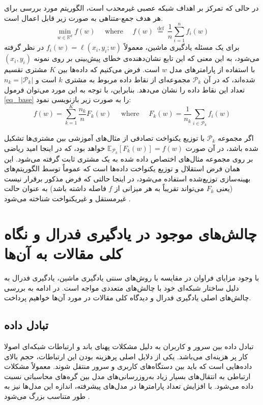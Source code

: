 در حالی که تمرکز بر اهداف شبکه عصبی غیرمحدب%
است، الگوریتم مورد بررسی برای هر هدف جمع-متناهی%
به صورت زیر قابل اعمال است.
\begin{equation}
	\min _{w \in \mathbb{R}^d} f(w) \quad \text { where } \quad f(w) \stackrel{\text { def }}{=} \frac{1}{n} \sum_{i=1}^n f_i(w)
	\label{eq_base}
\end{equation}
برای یک مسئله یادگیری ماشین، معمولاً
$f_i(w)=\ell\left(x_i, y_i ; w\right)$
در نظر گرفته می‌شود، به این معنی که این تابع نشان‌دهنده‌ی خطای پیش‌بینی بر روی نمونه
$(x_i, y_i)$
با استفاده از پارامترهای مدل
$w$
است. فرض می‌کنیم که داده‌ها بین
$K$
مشتری تقسیم شده‌اند، که در آن
$\mathcal{P}_k$
مجموعه‌ای از نقاط داده مربوط به مشتری
$k$
است و
$n_k=\left|\mathcal{P}_k\right|$
تعداد این نقاط داده را نشان می‌دهد. بنابراین، با توجه به این مورد می‌توان فرمول
\ref{eq_base}
را به صورت زیر بازنویسی نمود:
\begin{equation}
	f(w)=\sum_{k=1}^K \frac{n_k}{n} F_k(w) \quad \text { where } \quad F_k(w)=\frac{1}{n_k} \sum_{i \in \mathcal{P}_k} f_i(w)
\end{equation}

اگر مجموعه
$\mathcal{P}_k$
با توزیع یکنواخت%
تصادفی از مثال‌های آموزشی بین مشتری‌ها تشکیل شده باشد، در آن صورت
$\mathbb{E}_{\mathcal{P}_k}\left[F_k(w)\right]=f(w)$ 
خواهد بود، که در اینجا امید ریاضی بر روی مجموعه مثال‌های اختصاص داده شده به یک مشتری ثابت گرفته می‌شود. این همان فرض
استقلال و توزیع یکنواخت داده‌ها%
است که عموماً توسط الگوریتم‌های بهینه‌سازی توزیع‌شده استفاده می‌شود، در اینجا حالتی که فرض مذکور برقرار نیست (یعنی
$F_k$
می‌تواند تقریباً به هر میزانی از
$f$
فاصله داشته باشد) به عنوان حالت
غیرمستقل و غیریکنواخت
شناخته می‌شود
\cite{mcmahan2017communication}.



\section{چالش‌های موجود در یادگیری فدرال و نگاه کلی مقالات به آن‌ها}
با وجود مزایای فراوان در مقایسه با روش‌های سنتی یادگیری ماشین، یادگیری فدرال به دلیل ساختار شبکه‌ای خود با چالش‌های متعددی مواجه است. در ادامه به بررسی چالش‌های اصلی یادگیری فدرال و دیدگاه کلی مقالات در مورد آن‌ها خواهیم پرداخت.


\subsection{تبادل داده}
تبادل داده بین سرور و کاربران به دلیل مشکلات پهنای باند و ارتباطات شبکه‌ای اصولا کار پر هزینه‌ای می‌باشد. یکی از دلایل اصلی پرهزینه بودن این ارتباطات، حجم بالای داده‌هایی است که باید بین دستگاه‌های کاربری و سرور منتقل شوند.
معمولاً مشکلات ارتباطی به انتقال‌های بسیار زیاد به‌روزرسانی‌های مدل بین گره‌های محاسباتی نسبت داده می‌شود. با افزایش تعداد پارامترها در مدل‌های پیشرفته، اندازه این مدل‌ها نیز به طور متناسب بزرگ می‌شود
\cite{wang2018atomo}.

